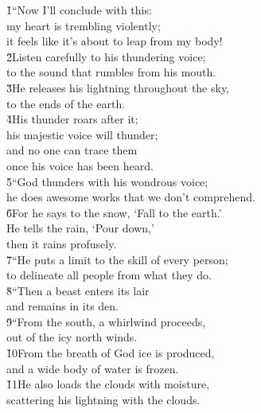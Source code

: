 \begin{poetry}
\poeml {}
\v{1}``Now I'll conclude with this: \\
\poemll    my heart is trembling violently; \\
\poemlll       it feels like it's about to leap from my body! \\
\poeml \v{2}Listen carefully to his thundering voice; \\
\poemll    to the sound that rumbles from his mouth. \\
\poeml \v{3}He releases his lightning throughout the sky, \\
\poemll    to the ends of the earth. \\
\poeml \v{4}His thunder roars after it; \\
\poemll    his majestic voice will thunder; \\
\poeml and no one can trace them \\
\poemll    once his voice has been heard. \\
\poeml \v{5}``God thunders with his wondrous voice; \\
\poemll    he does awesome works that we don't comprehend. \\
\poeml \v{6}For he says to the snow, `Fall to the earth.' \\
\poemll    He tells the rain, `Pour down,' \\
\poemlll       then it rains profusely. \\
\poeml \v{7}``He puts a limit to the skill of every person; \\
\poemll    to delineate all people from what they do. \\
\poeml \v{8}``Then a beast enters its lair \\
\poemll    and remains in its den. \\
\poeml \v{9}``From the south, a whirlwind proceeds, \\
\poemll    out of the icy north winds. \\
\poeml \v{10}From the breath of God ice is produced, \\
\poemll    and a wide body of water is frozen. \\
\poeml \v{11}He also loads the clouds with moisture, \\
\poemll    scattering his lightning with the clouds. \\

\end{poetry}
